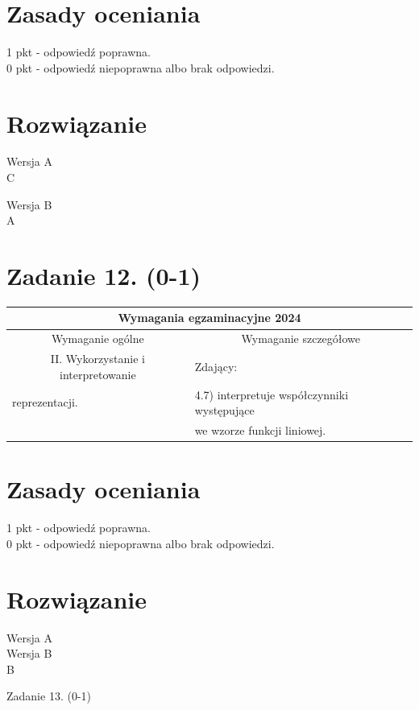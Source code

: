 \documentclass[10pt]{article}
\begin{document}
\section*{Zasady oceniania}
1 pkt - odpowiedź poprawna.\\
0 pkt - odpowiedź niepoprawna albo brak odpowiedzi.

\section*{Rozwiązanie}
Wersja A\\
C

Wersja B\\
A

\section*{Zadanie 12. (0-1)}
\begin{center}
\begin{tabular}{|l|l|}
\hline
\multicolumn{2}{|c|}{Wymagania egzaminacyjne 2024} \\
\hline
\multicolumn{1}{|c|}{Wymaganie ogólne} & \multicolumn{1}{c|}{Wymaganie szczegółowe} \\
\hline
\multicolumn{1}{|c|}{II. Wykorzystanie i interpretowanie} & Zdający: \\
reprezentacji. & 4.7) interpretuje współczynniki występujące \\
 & we wzorze funkcji liniowej. \\
\hline
\end{tabular}
\end{center}

\section*{Zasady oceniania}
1 pkt - odpowiedź poprawna.\\
0 pkt - odpowiedź niepoprawna albo brak odpowiedzi.

\section*{Rozwiązanie}
Wersja A\\
Wersja B\\
B

Zadanie 13. (0-1)
\end{document}

